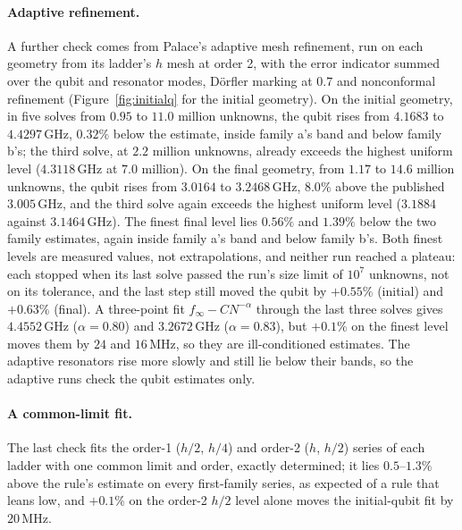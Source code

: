 \documentclass{anvil-paper}
\begin{document}
\paragraph{Adaptive refinement.}
A further check comes from Palace's adaptive mesh refinement, run on each
geometry from its ladder's $h$ mesh at order 2, with the error indicator summed
over the qubit and resonator modes, D\"orfler marking at $0.7$ and
nonconformal refinement (Figure~\ref{fig:initialq} for the initial
geometry). On the initial
geometry, in five solves from $0.95$ to $11.0$ million unknowns, the qubit
rises from $4.1683$ to $4.4297$\,GHz, $0.32\%$ below the estimate, inside
family a's band and below family b's; the third solve, at $2.2$ million unknowns, already exceeds the
highest uniform level ($4.3118$\,GHz at $7.0$ million). On the final
geometry, from $1.17$ to $14.6$ million unknowns, the qubit rises from
$3.0164$ to $3.2468$\,GHz, $8.0\%$ above the published $3.005$\,GHz, and
the third solve again exceeds the highest uniform level ($3.1884$ against
$3.1464$\,GHz). The finest final level lies $0.56\%$ and $1.39\%$ below the
two family estimates, again inside family a's band and below family b's. Both finest levels are measured
values, not extrapolations, and neither run reached a plateau: each stopped
when its last solve passed the run's size limit of $10^7$ unknowns, not on
its tolerance, and the last step still moved the qubit by $+0.55\%$ (initial)
and $+0.63\%$ (final). A three-point fit $f_\infty - CN^{-\alpha}$ through
the last three solves gives $4.4552$\,GHz ($\alpha = 0.80$) and
$3.2672$\,GHz ($\alpha = 0.83$), but $+0.1\%$ on the finest level moves
them by $24$ and $16$\,MHz, so they are ill-conditioned estimates. The
adaptive resonators rise more slowly and still lie below their bands, so
the adaptive runs check the qubit estimates only.

\paragraph{A common-limit fit.}
The last check fits the order-1 ($h/2$, $h/4$) and order-2 ($h$, $h/2$)
series of each ladder with one common limit and order, exactly determined; it lies
$0.5$--$1.3\%$ above the rule's estimate on every first-family series, as
expected of a rule that leans low, and $+0.1\%$ on the order-2 $h/2$ level
alone moves the initial-qubit fit by $20$\,MHz.
\end{document}
